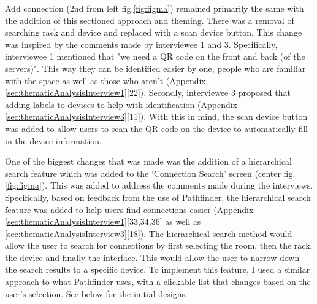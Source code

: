 \documentclass [11pt,a4paper]{article}
\begin{document}
Add connection (2nd from left fig.\ref{fig:figma}) remained primarily the same with the addition of this sectioned approach and theming. There was a removal of searching rack and device and replaced with a scan device button. This change was inspired by the comments made by interviewee 1 and 3. Specifically, interviewee 1 mentioned that "we need a QR code on the front and back (of the servers)". This way they can be identified easier by one, people who are familiar with the space as well as those who aren't (Appendix \ref{sec:thematicAnalysisInterview1}[22]). Secondly, interviewee 3 proposed that adding labels to devices to help with identification (Appendix \ref{sec:thematicAnalysisInterview3}[11]). With this in mind, the scan device button was added to allow users to scan the QR code on the device to automatically fill in the device information. 

One of the biggest changes that was made was the addition of a hierarchical search feature which was added to the `Connection Search' screen (center fig.\ref{fig:figma}). This was added to address the comments made during the interviews. Specifically, based on feedback from the use of Pathfinder, the hierarchical search feature was added to help users find connections easier (Appendix \ref{sec:thematicAnalysisInterview1}[33,34,36] as well as \ref{sec:thematicAnalysisInterview3}[18]). The hierarchical search method would allow the user to search for connections by first selecting the room, then the rack, the device and finally the interface. This would allow the user to narrow down the search results to a specific device. To implement this feature, I used a similar approach to what Pathfinder \cite{PathfinderMobile} uses, with a clickable list that changes based on the user's selection. See below for the initial designs.
\end{document}
